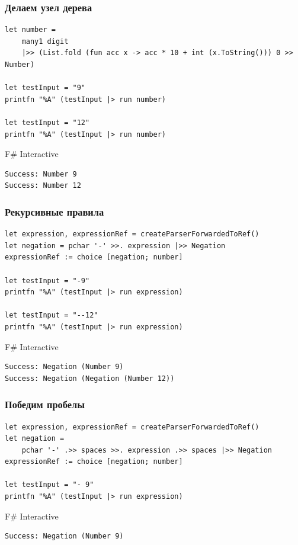 \documentclass[xetex,mathserif,serif]{beamer}
\begin{document}
    \begin{frame}[fragile]
        \frametitle{Делаем узел дерева}
        \begin{verbatim}
let number = 
    many1 digit 
    |>> (List.fold (fun acc x -> acc * 10 + int (x.ToString())) 0 >> Number)

let testInput = "9"
printfn "%A" (testInput |> run number)

let testInput = "12"
printfn "%A" (testInput |> run number)
        \end{verbatim}

        \begin{exampleblock}{F\# Interactive}
            \begin{verbatim}
Success: Number 9
Success: Number 12
            \end{verbatim}
        \end{exampleblock}
    \end{frame}

    \begin{frame}[fragile]
        \frametitle{Рекурсивные правила}
        \begin{verbatim}
let expression, expressionRef = createParserForwardedToRef()
let negation = pchar '-' >>. expression |>> Negation
expressionRef := choice [negation; number]

let testInput = "-9"
printfn "%A" (testInput |> run expression)

let testInput = "--12"
printfn "%A" (testInput |> run expression)
        \end{verbatim}

        \begin{exampleblock}{F\# Interactive}
            \begin{verbatim}
Success: Negation (Number 9)
Success: Negation (Negation (Number 12))
            \end{verbatim}
        \end{exampleblock}
    \end{frame}

    \begin{frame}[fragile]
        \frametitle{Победим пробелы}
        \begin{verbatim}
let expression, expressionRef = createParserForwardedToRef()
let negation = 
    pchar '-' .>> spaces >>. expression .>> spaces |>> Negation
expressionRef := choice [negation; number]

let testInput = "- 9"
printfn "%A" (testInput |> run expression)
        \end{verbatim}

        \begin{exampleblock}{F\# Interactive}
            \begin{verbatim}
Success: Negation (Number 9)
            \end{verbatim}
        \end{exampleblock}
    \end{frame}
\end{document}

